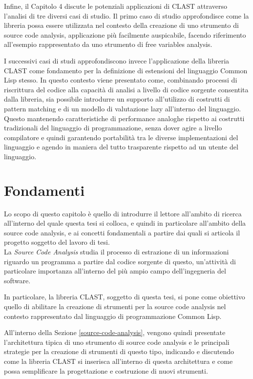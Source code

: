 \documentclass{book}
\begin{document}
Infine, il Capitolo 4 discute le potenziali applicazioni di CLAST attraverso
l’analisi di tre diversi casi di studio. Il primo caso di studio approfondisce
come la libreria possa essere utilizzata nel contesto della creazione di uno
strumento di source code analysis, applicazione più facilmente auspicabile,
facendo riferimento all’esempio rappresentato da uno strumento di free variables
analysis.

I successivi casi di studi approfondiscono invece l’applicazione della libreria
CLAST come fondamento per la definizione di estensioni del linguaggio Common
Lisp stesso. In questo contesto viene presentato come, combinando processi di
riscrittura del codice alla capacità di analisi a livello di codice sorgente
consentita dalla libreria, sia possibile introdurre un supporto all’utilizzo di
costrutti di pattern matching e di un modello di valutazione lazy all’interno
del linguaggio. Questo mantenendo caratteristiche di performance analoghe
rispetto ai costrutti tradizionali del linguaggio di programmazione, senza dover
agire a livello compilatore e quindi garantendo portabilità tra le diverse
implementazioni del linguaggio e agendo in maniera del tutto trasparente
rispetto ad un utente del linguaggio.

\begingroup
\let\clearpage\relax

\chapter{Fondamenti}

Lo scopo di questo capitolo è quello di introdurre il lettore all’ambito di
ricerca all’interno del quale questa tesi si colloca, e quindi in particolare
all’ambito della source code analysis, e ai concetti fondamentali a partire dai
quali si articola il progetto soggetto del lavoro di tesi.\\

La \textit{Source Code Analysis} studia il processo di estrazione di un
informazioni riguardo un programma a partire dal codice sorgente di questo,
un’attività di particolare importanza all'interno del più ampio campo
dell'ingegneria del software.

In particolare, la libreria CLAST, soggetto di questa tesi, si pone come
obiettivo quello di abilitare la creazione di strumenti per la source code
analysis nel contesto rappresentato dal linguaggio di programmazione Common
Lisp.

All'interno della Sezione \ref{source-code-analysis}, vengono quindi presentate
l'architettura tipica di uno strumento di source code analysis e le principali
strategie per la creazione di strumenti di questo tipo, indicando e discutendo
come la libreria CLAST si inserisca all'interno di questa architettura e come
possa semplificare la progettazione e costruzione di nuovi strumenti.\\
\end{document}
